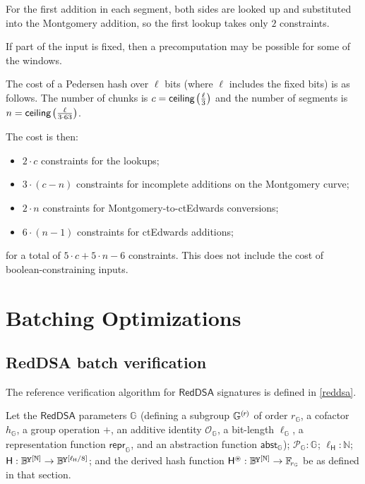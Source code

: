 \documentclass{article}
\newcommand{\crossref}[1]{\autoref{#1}}
\newcommand{\typecolon}{:}
\newcommand{\overlap}[2]{\rlap{#2}\hspace{#1}{#2}}
\newcommand{\byte}{\mathbb{B}\kern -0.1em\raisebox{0.48ex}{\overlap{0.0001em}{\scalebox{0.7}{$\mathbb{Y}$}}}}
\newcommand{\Nat}{\mathbb{N}}
\newcommand{\Field}[1]{\mathbb{F}_{\!#1}}
\newcommand{\typeexp}[2]{{#1}\vphantom{)}^{[{#2}]}}
\newcommand{\byteseq}[1]{\typeexp{\byte}{#1}}
\newcommand{\byteseqs}{\byteseq{\Nat}}
\newcommand{\ceiling}[1]{\mathsf{ceiling}\kern-0.06em\left({#1}\right)}
\newcommand{\mult}{\cdot}
\newcommand{\RedDSA}{\mathsf{RedDSA}}
\newcommand{\RedDSAHash}{\mathsf{H}}
\newcommand{\RedDSAHashToScalar}{\RedDSAHash^{\circledast}}
\newcommand{\RedDSAHashLength}{\ell_{\RedDSAHash}}
\newcommand{\Zero}{\mathcal{O}}
\newcommand{\Generator}{\mathcal{P}}
\newcommand{\subgroupr}{(\kern-0.075emr\kern-0.075em)}
\newcommand{\ParamG}[1]{{{#1}_\mathbb{G}}}
\newcommand{\GroupG}[1]{\mathbb{G}_{#1}}
\newcommand{\SubgroupG}[1]{\GroupG{#1}^{\subgroupr}}
\newcommand{\ZeroG}[1]{\Zero_{\GroupG{#1}}}
\newcommand{\GenG}[1]{\Generator_{\GroupG{#1}}}
\newcommand{\ellG}[1]{\ell_{\GroupG{#1}}}
\newcommand{\reprG}[1]{\repr_{\GroupG{#1}}}
\newcommand{\abstG}[1]{\abst_{\GroupG{#1}}}
\newcommand{\repr}{\mathsf{repr}}
\newcommand{\abst}{\mathsf{abst}}
\begin{document}
For the first addition in each segment, both sides are looked up and substituted into the Montgomery
addition, so the first lookup takes only $2$ constraints.

If part of the input is fixed, then a precomputation may be possible for some
of the windows.

The cost of a Pedersen hash over $\ell$ bits (where $\ell$ includes the fixed
bits) is as follows. The number of chunks is $c = \ceiling{\frac{\ell}{3}}$ and
the number of segments is $n = \ceiling{\frac{\ell}{3 \mult 63}}$.

The cost is then:

\begin{itemize}
  \item $2 \mult c$ constraints for the lookups;
  \item $3 \mult (c-n)$ constraints for incomplete additions on the Montgomery curve;
  \item $2 \mult n$ constraints for Montgomery-to-ctEdwards conversions;
  \item $6 \mult (n-1)$ constraints for ctEdwards additions;
\end{itemize}

for a total of $5 \mult c + 5 \mult n - 6$ constraints. This does not include
the cost of boolean-constraining inputs.


\section{Batching Optimizations} \label{batching}

\subsection{RedDSA batch verification} \label{reddsabatchvalidate}

The reference verification algorithm for $\RedDSA$ signatures is defined in \crossref{reddsa}.

Let the $\RedDSA$ parameters $\GroupG{}$ (defining a subgroup $\SubgroupG{}$ of order $\ParamG{r}$,
a cofactor $\ParamG{h}$, a group operation $+$, an additive identity $\ZeroG{}$, a bit-length $\ellG{}$,
a representation function $\reprG{}$, and an abstraction function $\abstG{}$); $\GenG{} \typecolon \GroupG{}$;
$\RedDSAHashLength \typecolon \Nat$; $\RedDSAHash \typecolon \byteseqs \rightarrow \byteseq{\RedDSAHashLength/8}$;
and the derived hash function $\RedDSAHashToScalar \typecolon \byteseqs \rightarrow \Field{\ParamG{r}}$
be as defined in that section.
\end{document}
